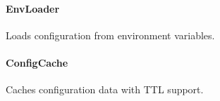 \hypertarget{envloader-1}{%
\paragraph{EnvLoader}\label{envloader-1}}

Loads configuration from environment variables.

\begin{Shaded}
\begin{Highlighting}[]
\OperatorTok{\textless{}}\OperatorTok{\textgreater{}} \OperatorTok{\textless{}}\OperatorTok{\textgreater{}}\NormalTok{ \{}
  \NormalTok{(}
\OperatorTok{:}\OperatorTok{,}
\OperatorTok{:} \OperatorTok{,}
\NormalTok{  )}\OperatorTok{;}
  
  \NormalTok{()}\OperatorTok{:} \OperatorTok{\textless{}}\OperatorTok{\textgreater{};}
   \NormalTok{()}\OperatorTok{:} \OperatorTok{;}
\NormalTok{\}}
\end{Highlighting}
\end{Shaded}

\hypertarget{configcache-1}{%
\paragraph{ConfigCache}\label{configcache-1}}

Caches configuration data with TTL support.

